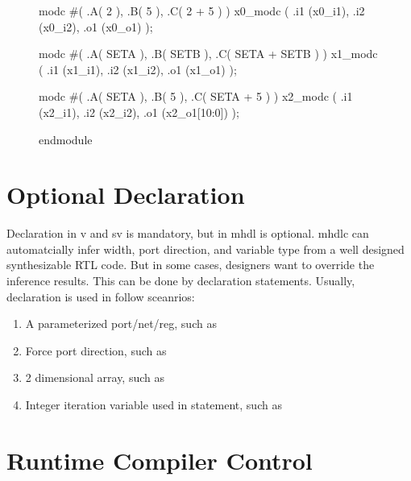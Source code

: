 \begin{figure}[ptb]
\begin{minipage}[t]{.48\textwidth}
\begin{mhdle}[caption={Generated wrapper module in SystemVerilog}, label={lst:wrapper in sv}]
modc #(
       .A( 2 ),
       .B( 5 ),
       .C( 2 + 5 )	 
      ) x0_modc (
                 .i1 (x0_i1),
                 .i2 (x0_i2),
                 .o1 (x0_o1)
                );

modc #(
       .A( SETA ),
       .B( SETB ),
       .C( SETA + SETB )	 
      ) x1_modc (
                 .i1 (x1_i1),
                 .i2 (x1_i2),
                 .o1 (x1_o1)
                );

modc #(
       .A( SETA ),
       .B( 5 ),
       .C( SETA + 5 )	 
      ) x2_modc (
                 .i1 (x2_i1),
                 .i2 (x2_i2),
                 .o1 (x2_o1[10:0])
                );

endmodule
    \end{mhdle}
  \end{minipage}
\end{figure}

\section{Optional Declaration}
Declaration in \gls{v} and \gls{sv} is mandatory, but in \gls{mhdl} is optional.
\gls{mhdlc} can automatcially infer width, port direction, and variable type 
from a well designed synthesizable RTL code. But in some cases, designers want
to override the inference results. This can be done by declaration statements.
Usually,  declaration is used in follow sceanrios:
\begin{enumerate}
\item A parameterized port/net/reg, such as 
\item Force port direction, such as 
\item 2 dimensional array, such as 
\item Integer iteration variable used in  statement, such as 
\end{enumerate}

\section{Runtime Compiler Control}
